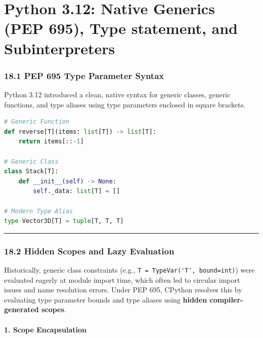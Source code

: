 \hypertarget{python-3.12-native-generics-pep-695-type-statement-and-subinterpreters}{%
\chapter{Python 3.12: Native Generics (PEP 695), Type statement, and
Subinterpreters}\label{python-3.12-native-generics-pep-695-type-statement-and-subinterpreters}}

\hypertarget{pep-695-type-parameter-syntax}{%
\subsection{18.1 PEP 695 Type Parameter
Syntax}\label{pep-695-type-parameter-syntax}}

Python 3.12 introduced a clean, native syntax for generic classes,
generic functions, and type aliases using type parameters enclosed in
square brackets.

\begin{lstlisting}[language=Python]
# Generic Function
def reverse[T](items: list[T]) -> list[T]:
    return items[::-1]

# Generic Class
class Stack[T]:
    def __init__(self) -> None:
        self._data: list[T] = []

# Modern Type Alias
type Vector3D[T] = tuple[T, T, T]
\end{lstlisting}

\begin{center}\rule{0.5\linewidth}{0.5pt}\end{center}

\hypertarget{hidden-scopes-and-lazy-evaluation}{%
\subsection{18.2 Hidden Scopes and Lazy
Evaluation}\label{hidden-scopes-and-lazy-evaluation}}

Historically, generic class constraints (e.g.,
\passthrough{\lstinline!T = TypeVar('T', bound=int)!}) were evaluated
eagerly at module import time, which often led to circular import issues
and name resolution errors. Under PEP 695, CPython resolves this by
evaluating type parameter bounds and type aliases using \textbf{hidden
compiler-generated scopes}.

\hypertarget{scope-encapsulation}{%
\subsubsection{1. Scope Encapsulation}\label{scope-encapsulation}}

